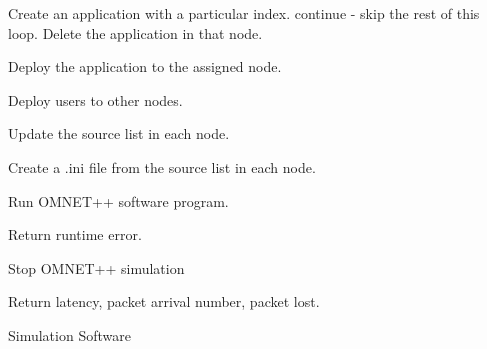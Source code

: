 \documentclass[conference]{IEEEtran}
\makeatletter
\newcommand{\removelatexerror}{\let\@latex@error\@gobble}
\makeatother
\begin{document}
\removelatexerror
\begin{algorithm}[]
    \DontPrintSemicolon
        

        {
            {
                {
                    Create an application with a particular index.
                }
                {
                    continue - skip the rest of this loop.
                }
                {
                    Delete the application in that node.
                }

                Deploy the application to the assigned node.

                Deploy users to other nodes.

            }

            Update the source list in each node.

            Create a .ini file from the source list in each node.

            Run OMNET++ software program.

            {
                Return runtime error.
                
                Stop OMNET++ simulation
            }
            \Else
            {
                Return latency, packet arrival number, packet lost.
            }
        }
    \caption{Simulation Software}
    \label{algo:simulation-python}
\end{algorithm}
\end{document}
